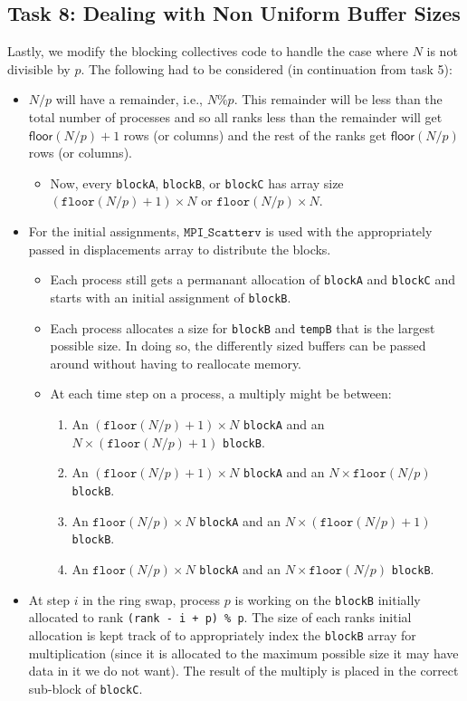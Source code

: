 \documentclass{article}
\begin{document}
\subsection*{Task 8: Dealing with Non Uniform Buffer Sizes}
Lastly, we modify the blocking collectives code to handle the case where $N$ 
is not divisible by $p$. The following had to be considered (in continuation from task 5):
\begin{itemize}
    \item $N/p$ will have a remainder, i.e., $N \% p$. This remainder 
    will be less than the total number of processes and so all ranks less than 
    the remainder will get $\mathsf{floor}(N/p) + 1$ rows (or columns) and the 
    rest of the ranks get $\mathsf{floor}(N/p)$ rows (or columns).
    \begin{itemize}
        \item Now, every \texttt{blockA}, \texttt{blockB}, or \texttt{blockC} has 
        array size $(\texttt{floor}(N/p) + 1) \times N$ or $\texttt{floor}(N/p) \times N$. 
    \end{itemize}
    \item For the initial assignments, $\texttt{MPI\_Scatterv}$ is used with the appropriately passed 
    in displacements array to distribute the blocks.
    \begin{itemize}
        \item Each process still gets a permanant allocation of \texttt{blockA} and \texttt{blockC} and 
        starts with an initial assignment of \texttt{blockB}.
        \item Each process allocates a size for \texttt{blockB} and \texttt{tempB} that is the largest possible size.
        In doing so, the differently sized buffers can be passed around without having to reallocate memory.
        \item At each time step on a process, a multiply might be between:
        \begin{enumerate}
            \item An $(\texttt{floor}(N/p) + 1) \times N$ \texttt{blockA} and an $N \times (\texttt{floor}(N/p) + 1)$ \texttt{blockB}.
            \item An $(\texttt{floor}(N/p) + 1) \times N$ \texttt{blockA} and an $N \times \texttt{floor}(N/p)$ \texttt{blockB}.
            \item An $\texttt{floor}(N/p) \times N$ \texttt{blockA} and an $N \times (\texttt{floor}(N/p) + 1)$ \texttt{blockB}.
            \item An $\texttt{floor}(N/p) \times N$ \texttt{blockA} and an $N \times \texttt{floor}(N/p)$ \texttt{blockB}.
        \end{enumerate}
    \end{itemize}
    \item At step $i$ in the ring swap, process $p$ is working on the \texttt{blockB} initially allocated to rank \texttt{(rank - i + p) \% p}.
    The size of each ranks initial allocation is kept track of to appropriately index the \texttt{blockB} array for multiplication 
    (since it is allocated to the maximum possible size it may have data in it we do not want). The result of the multiply is placed in the correct sub-block of \texttt{blockC}.


\end{itemize}
\end{document}
